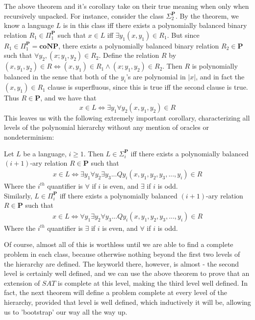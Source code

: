 The above theorem and it's corollary take on their true meaning when only when recursively unpacked. For instance, consider the class $\Sigma_2^{\textbf{P}}$. By the theorem, we know a language $L$ is in this class iff there exists a polynomially balanced binary relation $R_1 \in \Pi_1^{\textbf{P}}$ such that $x \in L$ iff $\exists y_1 (x,y_1) \in R_1$. But since $R_1 \in \Pi_1^{\textbf{P}} = \textbf{coNP}$, there exists a polynomially balanced binary relation $R_2 \in \textbf{P}$ such that $\forall y_2, (x;y_1,y_2) \in R_2$. Define the relation $R$ by $(x,y_1,y_2) \in R \iff (x,y_1) \in R_1 \wedge (x;y_1,y_2) \in R_2$. Then $R$ is polynomially balanced in the sense that both of the $y_i$'s are polynomial in $|x|$, and in fact the $(x,y_1) \in R_1$ clause is superfluous, since this is true iff the second clause is true. Thus $R \in \textbf{P}$, and we have that \[x \in L \iff \exists y_1 \forall y_2 (x,y_1,y_2) \in R \]
This leaves us with the following extremely important corollary, characterizing all levels of the polynomial hierarchy without any mention of oracles or nondeterminism:
\begin{theorem}
    Let $L$ be a language, $i \geq 1$. Then $L \in \Sigma_i^{\textbf{P}}$ iff there exists a polynomially balanced $(i+1)$-ary relation $R \in \textbf{P}$ such that
    \begin{align}
        x \in L \iff \exists y_1 \forall y_2 \exists y_3 ... Q y_i(x,y_1,y_2,y_3,...,y_i) \in R
    \end{align}
    Where the $i^{th}$ quantifier is $\forall$ if $i$ is even, and $\exists$ if $i$ is odd. \\
    Similarly, $L \in \Pi_i^{\textbf{P}}$ iff there exists a polynomially balanced $(i+1)$-ary relation $R \in \textbf{P}$ such that
    \begin{align}
         x \in L \iff \forall y_1 \exists y_2 \forall y_3 ... Q y_i(x,y_1,y_2,y_3,...,y_i) \in R
    \end{align}
    Where the $i^{th}$ quantifier is $\exists$ if $i$ is even, and $\forall$ if $i$ is odd.
\end{theorem}
Of course, almost all of this is worthless until we are able to find a complete problem in each class, because otherwise nothing beyond the first two levels of the hierarchy are defined. The keyworld there, however, is almost - the second level is certainly well defined, and we can use the above theorem to prove that an extension of $SAT$ is complete at this level, making the third level well defined. In fact, the next theorem will define a problem complete at every level of the hierarchy, provided that level is well defined, which inductively it will be, allowing us to 'bootstrap' our way all the way up.
